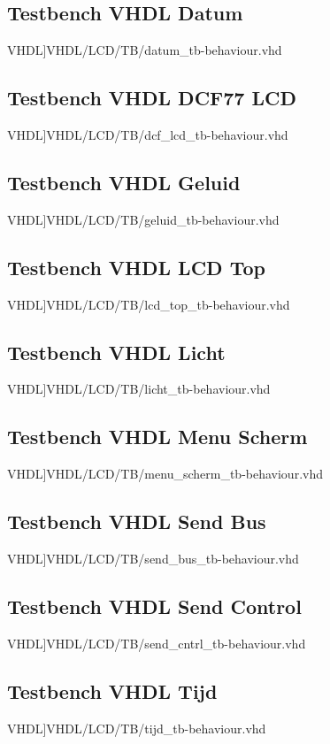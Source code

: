 \subsection{Testbench VHDL Datum}
\scriptsize 
 VHDL]{VHDL/LCD/TB/datum_tb-behaviour.vhd}
\normalsize
\label{code:tb_datum}
\subsection{Testbench VHDL DCF77 LCD}
\scriptsize 
 VHDL]{VHDL/LCD/TB/dcf_lcd_tb-behaviour.vhd}
\normalsize
\label{code:tb_dcf_lcd}
\subsection{Testbench VHDL Geluid}
\scriptsize 
 VHDL]{VHDL/LCD/TB/geluid_tb-behaviour.vhd}
\normalsize
\label{code:tb_geluid}
\subsection{Testbench VHDL LCD Top}
\scriptsize 
 VHDL]{VHDL/LCD/TB/lcd_top_tb-behaviour.vhd}
\normalsize
\label{code:tb_lcd_top}
\subsection{Testbench VHDL Licht}
\scriptsize 
 VHDL]{VHDL/LCD/TB/licht_tb-behaviour.vhd}
\normalsize
\label{code:tb_licht}
\subsection{Testbench VHDL Menu Scherm}
\scriptsize 
 VHDL]{VHDL/LCD/TB/menu_scherm_tb-behaviour.vhd}
\normalsize
\label{code:tb_menu_scherm}
\subsection{Testbench VHDL Send Bus}
\scriptsize 
 VHDL]{VHDL/LCD/TB/send_bus_tb-behaviour.vhd}
\normalsize
\label{code:tb_send_bus}
\subsection{Testbench VHDL Send Control}
\scriptsize 
 VHDL]{VHDL/LCD/TB/send_cntrl_tb-behaviour.vhd}
\normalsize
\label{code:tb_send_cntrl}
\subsection{Testbench VHDL Tijd}
\scriptsize 
 VHDL]{VHDL/LCD/TB/tijd_tb-behaviour.vhd}
\normalsize
\label{code:tb_tijd}
